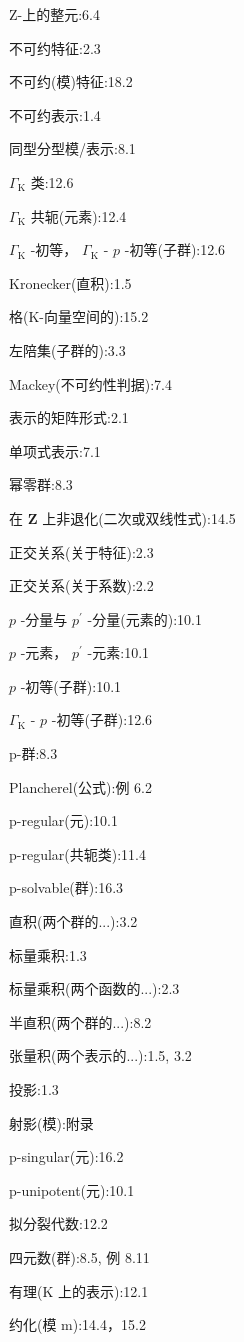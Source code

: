 \documentclass[10pt]{article}
\begin{document}
Z-上的整元:6.4

不可约特征:2.3

不可约(模)特征:18.2

不可约表示:1.4

同型分型模/表示:8.1

\({\Gamma }_{\mathrm{K}}\) 类:12.6

\({\Gamma }_{\mathrm{K}}\) 共轭(元素):12.4

\({\Gamma }_{\mathrm{K}}\) -初等， \({\Gamma }_{\mathrm{K}}\) - \(p\) -初等(子群):12.6

Kronecker(直积):1.5

格(K-向量空间的):15.2

左陪集(子群的):3.3

Mackey(不可约性判据):7.4

表示的矩阵形式:2.1

单项式表示:7.1

幂零群:8.3

在 \(\mathbf{Z}\) 上非退化(二次或双线性式):14.5

正交关系(关于特征):2.3

正交关系(关于系数):2.2

\(p\) -分量与 \({p}^{\prime }\) -分量(元素的):10.1

\(p\) -元素， \({p}^{\prime }\) -元素:10.1

\(p\) -初等(子群):10.1

\({\Gamma }_{\mathrm{K}}\) - \(p\) -初等(子群):12.6

p-群:8.3

Plancherel(公式):例 6.2

p-regular(元):10.1

p-regular(共轭类):11.4

p-solvable(群):16.3

直积(两个群的...):3.2

标量乘积:1.3

标量乘积(两个函数的...):2.3

半直积(两个群的...):8.2

张量积(两个表示的...):1.5, 3.2

投影:1.3

射影(模):附录

p-singular(元):16.2

p-unipotent(元):10.1

拟分裂代数:12.2

四元数(群):8.5, 例 8.11

有理(K 上的表示):12.1

约化(模 m):14.4，15.2
\end{document}
